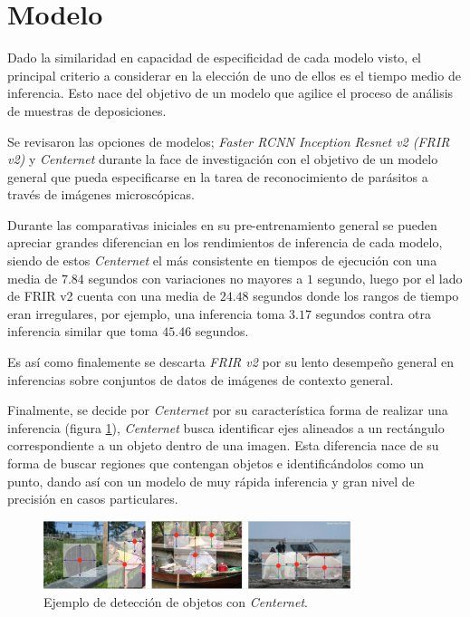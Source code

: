 \documentclass[letter,12pt]{report}
\begin{document}
\section{Modelo}
Dado la similaridad en capacidad de especificidad de cada modelo visto, el
principal criterio a considerar en la elección de uno de ellos es el tiempo
medio de inferencia. Esto nace del objetivo de un modelo que agilice el proceso
de análisis de muestras de deposiciones.

Se revisaron las opciones de modelos; \textit{Faster RCNN Inception Resnet v2 (FRIR v2)} y
\textit{Centernet} durante la face de investigación con el objetivo de un modelo general que
pueda especificarse en la tarea de reconocimiento de parásitos a través de imágenes
microscópicas.

Durante las comparativas iniciales en su pre-entrenamiento general se pueden apreciar grandes
diferencian en los rendimientos de inferencia de cada modelo, siendo de estos
\textit{Centernet} el más consistente en tiempos de ejecución con una media de $7.84$
segundos con variaciones no mayores a $1$ segundo, luego por el lado de FRIR v2 cuenta con una
media de $24.48$ segundos donde los rangos de tiempo eran irregulares, por ejemplo, una
inferencia toma $3.17$ segundos contra otra inferencia similar que toma $45.46$ segundos.

Es así como finalemente se descarta \textit{FRIR v2} por su lento desempeño general en
inferencias sobre conjuntos de datos de imágenes de contexto general.

Finalmente, se decide por \textit{Centernet} por su característica forma de realizar una
inferencia (figura \ref{fig:centernet}), \textit{Centernet} busca identificar ejes alineados a un rectángulo
correspondiente a un objeto dentro de una imagen. Esta diferencia nace de su forma de 
buscar regiones que contengan objetos e identificándolos como un punto, dando así con un
modelo de muy rápida inferencia y gran nivel de precisión en casos particulares.

\begin{figure}[ht]
    \centering
    \includegraphics[width=0.8\textwidth]{centernet}
    \caption{Ejemplo de detección de objetos con \textit{Centernet}.}
    \label{fig:centernet}
\end{figure}
\end{document}
